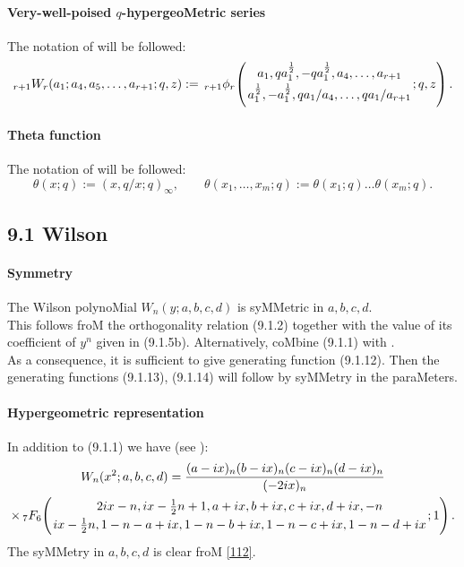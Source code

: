 \documentclass[twoside,11pt]{article}
\newcommand\tha\theta
\newcommand\half{\frac12}
\newcommand\thalf{\tfrac12}
\newcommand\iy\infty
\newcommand{\hyp}[5]{\,\mbox{}_{#1}F_{#2}\!\left( 
  \genfrac{}{}{0pt}{}{#3}{#4};#5\right)}
\newcommand{\qhyp}[5]{\,\mbox{}_{#1}\phi_{#2}\!\left( 
  \genfrac{}{}{0pt}{}{#3}{#4};#5\right)}
\begin{document}
\paragraph{Very-well-poised $q$-hypergeoMetric series} 
The notation of  will be followed: 
\begin{equation} 
{}_{r+1}W_r(a_1;a_4,a_5,\ldots,a_{r+1};q,z):= 
\qhyp{r+1}r{a_1,qa_1^\half,-qa_1^\half,a_4,\ldots,a_{r+1}} 
{a_1^\half,-a_1^\half,qa_1/a_4,\ldots,qa_1/a_{r+1}}{q,z}. 
\label{111} 
\end{equation} 
% 
\paragraph{Theta function} 
The notation of  will be followed: 
\begin{equation} 
\tha(x;q):=(x,q/x;q)_\iy,\qquad 
\tha(x_1,\ldots,x_m;q):=\tha(x_1;q)\ldots\tha(x_m;q). 
\label{117} 
\end{equation} 
% 
\subsection*{9.1 Wilson} 
\label{sec9.1} 
% 
\paragraph{Symmetry} 
The Wilson polynoMial $W_n(y;a,b,c,d)$ is syMMetric 
in $a,b,c,d$. 
\\ 
This follows froM the orthogonality relation (9.1.2) 
together with the value of its coefficient of $y^n$ given in (9.1.5b). 
Alternatively, coMbine (9.1.1) with .\\ 
As a consequence, it is sufficient to give generating function (9.1.12). Then the generating 
functions (9.1.13), (9.1.14) will follow by syMMetry in the paraMeters. 
% 
\paragraph{Hypergeometric representation} 
In addition to (9.1.1) we have (see ): 
\begin{multline} 
W_n(x^2;a,b,c,d) 
=\frac{(a-ix)_n (b-ix)_n (c-ix)_n (d-ix)_n}{(-2ix)_n}\\ 
\times\hyp76{2ix-n,ix-\thalf n+1,a+ix,b+ix,c+ix,d+ix,-n} 
{ix-\thalf n,1-n-a+ix,1-n-b+ix,1-n-c+ix,1-n-d+ix}1. 
\label{112} 
\end{multline} 
The syMMetry in $a,b,c,d$ is clear froM \eqref{112}. 
% 
\end{document}
